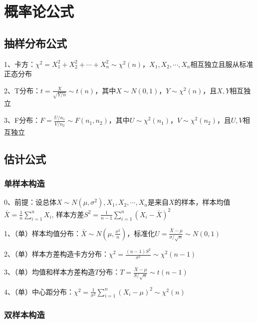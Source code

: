 \chapter{概率论公式}

\section{抽样分布公式}

1、卡方：$\chi^{2} = X_1^2+X_2^2+\cdots+X_n^2 \sim \chi^{2}(n)$，$X_1,X_2,\cdots ,X_n$相互独立且服从标准正态分布

2、T分布：$t=\frac{X}{\sqrt{Y/n}} \sim t(n)$，其中$X \sim N(0,1)$，$Y\sim \chi^{2}\left(n\right)$，且$X,Y$相互独立

3、F分布：$F=\frac{U / n_{1}}{V / n_{2}} \sim F\left(n_{1}, n_{2}\right)$，其中$U \sim \chi^{2}\left(n_{1}\right)$，$ V \sim \chi^{2}\left(n_{2}\right)$，且$U,V$相互独立

\section{估计公式}



\subsection{单样本构造}

0、前提：设总体$X \sim N\left(\mu, \sigma^{2}\right), X_{1}, X_{2},\cdots, X_{n}$是来自$X$的样本，样本均值$\bar{X}=\frac{1}{n} \sum_{i=1}^{n} X_{i}$, 样本方差$S^{2}=\frac{1}{n-1} \sum_{i=1}^{n}\left(X_{i}-\bar{X}\right)^{2}$

1、（单）样本均值分布：$\bar{X} \sim N\left(\mu, \frac{\sigma^{2}}{n}\right)$，标准化$U=\frac{\bar{X}-\mu}{\sigma / \sqrt{n}} \sim N(0,1)$

2、（单）样本方差构造卡方分布：$\chi^{2}=\frac{(n-1) S^{2}}{\sigma^{2}} \sim \chi^{2}(n-1)$

3、（单）均值和样本方差构造$T$分布：$T=\frac{\bar{X}-\mu}{S / \sqrt{n}} \sim t(n-1)$

4、（单）中心距分布：$\chi^{2}=\frac{1}{\sigma^{2}} \sum_{i=1}^{n}\left(X_{i}-\mu\right)^{2} \sim \chi^{2}(n)$



\subsection{双样本构造}

